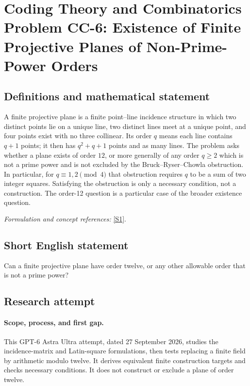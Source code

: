 \documentclass[11pt]{article}
\begin{document}
\section*{\texorpdfstring{Coding Theory and Combinatorics Problem CC-6: Existence of Finite Projective Planes of Non-Prime-Power Orders}{Coding Theory and Combinatorics Problem CC-6: Existence of Finite Projective Planes of Non-Prime-Power Orders}}\label{404}
\subsection{Definitions and mathematical statement}
A finite projective plane is a finite point--line incidence structure in which two distinct points lie on a unique line, two distinct lines meet at a unique point, and four points exist with no three collinear. Its order $q$ means each line contains $q+1$ points; it then has $q^2+q+1$ points and as many lines. The problem asks whether a plane exists of order $12$, or more generally of any order $q\ge2$ which is not a prime power and is not excluded by the Bruck--Ryser--Chowla obstruction. In particular, for $q\equiv1,2\pmod4$ that obstruction requires $q$ to be a sum of two integer squares. Satisfying the obstruction is only a necessary condition, not a construction. The order-12 question is a particular case of the broader existence question.
\par\smallskip\textit{Formulation and concept references:} \href{https://arxiv.org/pdf/0811.1254}{[S1]}.

\subsection{Short English statement}
Can a finite projective plane have order twelve, or any other allowable order that is not a prime power?
\subsection{Research attempt}
\paragraph{Scope, process, and first gap.}
This GPT-6 Astra Ultra attempt, dated 27 September 2026, studies the incidence-matrix and Latin-square formulations, then tests replacing a finite field by arithmetic modulo twelve. It derives equivalent finite construction targets and checks necessary conditions. It does not construct or exclude a plane of order twelve.
\end{document}
